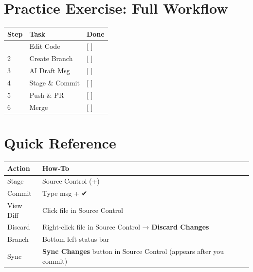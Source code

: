 \documentclass[
  letterpaper,
  DIV=11,
  numbers=noendperiod,
  oneside]{scrreprt}
\begin{document}
\chapter*{Practice Exercise: Full
Workflow}\label{practice-exercise-full-workflow}


\begin{longtable}[]{@{}lll@{}}
\toprule\noalign{}
Step & Task & Done \\
\midrule\noalign{}
\endhead
\bottomrule\noalign{}
\endlastfoot
1 & Edit Code & {[} {]} \\
2 & Create Branch & {[} {]} \\
3 & AI Draft Msg & {[} {]} \\
4 & Stage \& Commit & {[} {]} \\
5 & Push \& PR & {[} {]} \\
6 & Merge & {[} {]} \\
\end{longtable}

\chapter*{Quick Reference}\label{quick-reference-1}


\begin{longtable}[]{@{}
  >{\raggedright\arraybackslash}p{}
  >{\raggedright\arraybackslash}p{}@{}}
\toprule\noalign{}
\begin{minipage}[b]{\linewidth}\raggedright
Action
\end{minipage} & \begin{minipage}[b]{\linewidth}\raggedright
How-To
\end{minipage} \\
\midrule\noalign{}
\endhead
\bottomrule\noalign{}
\endlastfoot
Stage & Source Control (+) \\
Commit & Type msg + ✔ \\
View Diff & Click file in Source Control \\
Discard & Right-click file in Source Control → \textbf{Discard
Changes} \\
Branch & Bottom-left status bar \\
Sync & \textbf{Sync Changes} button in Source Control (appears after you
commit) \\
\end{longtable}
\end{document}
